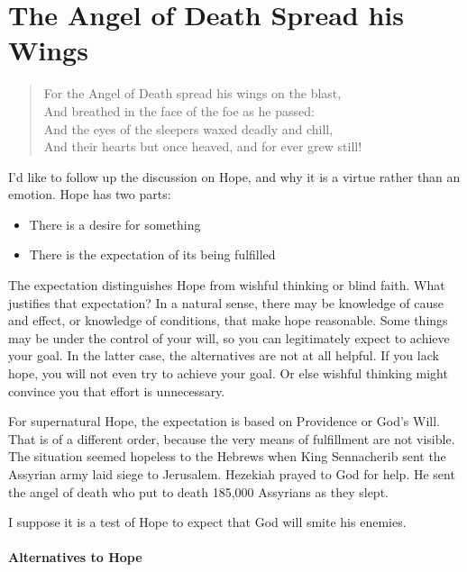\section{The Angel of Death Spread his Wings}

\begin{quotex}
\begin{verse}
For the Angel of Death spread his wings on the blast,\\ And breathed in the face of the foe as he passed:\\ And the eyes of the sleepers waxed deadly and chill,\\ And their hearts but once heaved, and for ever grew still!
\end{verse}
\end{quotex}


I'd like to follow up the discussion on Hope, and why it is a virtue rather than an emotion. Hope has two parts:

\begin{itemize}


\item There is a desire for something

\item There is the expectation of its being fulfilled
\end{itemize}


The expectation distinguishes Hope from wishful thinking or blind faith. What justifies that expectation? In a natural sense, there may be knowledge of cause and effect, or knowledge of conditions, that make hope reasonable. Some things may be under the control of your will, so you can legitimately expect to achieve your goal. In the latter case, the alternatives are not at all helpful. If you lack hope, you will not even try to achieve your goal. Or else wishful thinking might convince you that effort is unnecessary.

For supernatural Hope, the expectation is based on Providence or God's Will. That is of a different order, because the very means of fulfillment are not visible. The situation seemed hopeless to the Hebrews when King Sennacherib sent the Assyrian army laid siege to Jerusalem. Hezekiah prayed to God for help. He sent the angel of death who put to death 185,000 Assyrians as they slept.

I suppose it is a test of Hope to expect that God will smite his enemies.

\paragraph{Alternatives to Hope}


